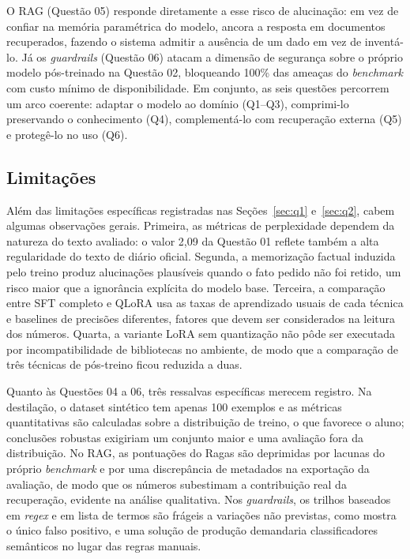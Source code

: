 O RAG (Questão 05) responde diretamente a esse risco de alucinação: em vez de confiar
na memória paramétrica do modelo, ancora a resposta em documentos recuperados,
fazendo o sistema admitir a ausência de um dado em vez de inventá-lo. Já os
\textit{guardrails} (Questão 06) atacam a dimensão de segurança sobre o próprio
modelo pós-treinado na Questão 02, bloqueando 100\% das ameaças do \textit{benchmark}
com custo mínimo de disponibilidade. Em conjunto, as seis questões percorrem um arco
coerente: adaptar o modelo ao domínio (Q1--Q3), comprimi-lo preservando o
conhecimento (Q4), complementá-lo com recuperação externa (Q5) e protegê-lo no uso
(Q6).

\subsection{Limitações}

Além das limitações específicas registradas nas Seções~\ref{sec:q1} e~\ref{sec:q2},
cabem algumas observações gerais. Primeira, as métricas de perplexidade dependem da
natureza do texto avaliado: o valor 2,09 da Questão 01 reflete também a alta
regularidade do texto de diário oficial. Segunda, a memorização factual induzida
pelo treino produz alucinações plausíveis quando o fato pedido não foi retido, um
risco maior que a ignorância explícita do modelo base. Terceira, a comparação entre
SFT completo e QLoRA usa as taxas de aprendizado usuais de cada técnica e baselines
de precisões diferentes, fatores que devem ser considerados na leitura dos números.
Quarta, a variante LoRA sem quantização não pôde ser executada por incompatibilidade
de bibliotecas no ambiente, de modo que a comparação de três técnicas de pós-treino
ficou reduzida a duas.

Quanto às Questões 04 a 06, três ressalvas específicas merecem registro. Na
destilação, o dataset sintético tem apenas 100 exemplos e as métricas quantitativas
são calculadas sobre a distribuição de treino, o que favorece o aluno; conclusões
robustas exigiriam um conjunto maior e uma avaliação fora da distribuição. No RAG, as
pontuações do Ragas são deprimidas por lacunas do próprio \textit{benchmark} e por uma
discrepância de metadados na exportação da avaliação, de modo que os números
subestimam a contribuição real da recuperação, evidente na análise qualitativa. Nos
\textit{guardrails}, os trilhos baseados em \textit{regex} e em lista de termos são
frágeis a variações não previstas, como mostra o único falso positivo, e uma solução
de produção demandaria classificadores semânticos no lugar das regras manuais.
